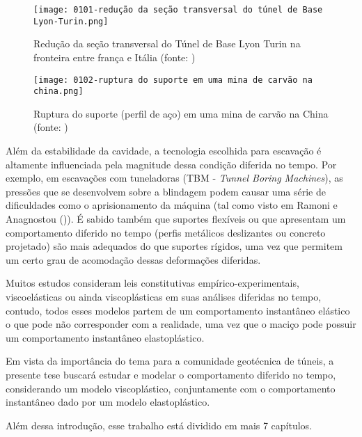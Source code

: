 \begin{figure}[H]
	\begin{center}
		\texttt{[image: 0101-redução da seção transversal do túnel de Base Lyon-Turin.png]}
	\end{center}
	\caption{\label{redução_base_turin}Redução da seção transversal do Túnel de Base Lyon Turin na fronteira entre frança e Itália (fonte: )}
\end{figure}

\begin{figure}[H]
	\begin{center}
		\texttt{[image: 0102-ruptura do suporte em uma mina de carvão na china.png]}
	\end{center}
	\caption{\label{ruptura_china}Ruptura do suporte (perfil de aço) em uma mina de carvão na China (fonte: )}
\end{figure}
 
Além da estabilidade da cavidade, a tecnologia escolhida para escavação é altamente influenciada pela magnitude dessa condição diferida no tempo. Por exemplo, em escavações com tuneladoras (TBM - \textit{Tunnel Boring Machines}), as pressões que se desenvolvem sobre a blindagem podem causar uma série de dificuldades como o aprisionamento da máquina (tal como visto em Ramoni e Anagnostou (\citeyear{Ramoni2010a,Ramoni2010b})). É sabido também que suportes flexíveis ou que apresentam um comportamento diferido no tempo (perfis metálicos deslizantes ou concreto projetado) são mais adequados do que suportes rígidos, uma vez que permitem um certo grau de acomodação dessas deformações diferidas.

Muitos estudos consideram leis constitutivas empírico-experimentais, viscoelásticas ou ainda viscoplásticas em suas análises diferidas no tempo, contudo, todos esses modelos partem de um comportamento instantâneo elástico o que pode não corresponder com a realidade, uma vez que o maciço pode possuir um comportamento instantâneo elastoplástico.

Em vista da importância do tema para a comunidade geotécnica de túneis, a presente tese buscará estudar e modelar o comportamento diferido no tempo, considerando um modelo viscoplástico, conjuntamente com o comportamento instantâneo dado por um modelo elastoplástico. 

Além dessa introdução, esse trabalho está dividido em mais 7 capítulos.

